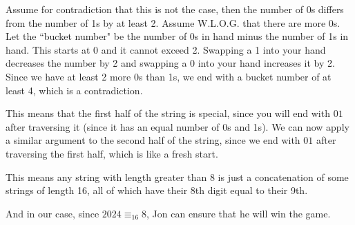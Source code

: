\documentclass[11pt]{article}
\begin{document}
Assume for contradiction that this is not the case, then the number of 0s differs from the number of 1s by at least 2. Assume W.L.O.G. that there are more 0s. Let the ``bucket number" be the number of 0s in hand minus the number of 1s in hand. This starts at 0 and it cannot exceed 2. Swapping a 1 into your hand decreases the number by 2 and swapping a 0 into your hand increases it by 2. Since we have at least 2 more 0s than 1s, we end with a bucket number of at least 4, which is a contradiction.

This means that the first half of the string is special, since you will end with $01$ after traversing it (since it has an equal number of 0s and 1s). We can now apply a similar argument to the second half of the string, since we end with $01$ after traversing the first half, which is like a fresh start.

This means any string with length greater than 8 is just a concatenation of some strings of length 16, all of which have their 8th digit equal to their 9th.

And in our case, since $2024 \equiv_{16} 8$, Jon can ensure that he will win the game.




\end{document}
